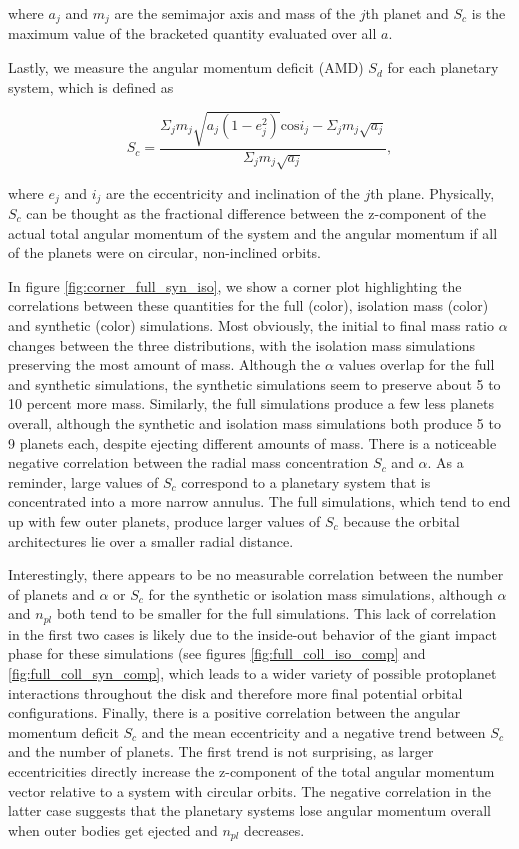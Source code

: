 \noindent where $a_{j}$ and $m_{j}$ are the semimajor axis and mass of the $j$th planet and $S_{c}$ is the maximum value of the bracketed quantity evaluated over all $a$.

Lastly, we measure the angular momentum deficit (AMD) $S_{d}$ for each planetary system, which is defined as

\begin{equation}\label{eq:amd}
	S_{c} = \frac{\Sigma_{j} m_{j} \sqrt{a_{j} \left( 1 - e_{j}^2 \right)} \mathrm{cos} i_{j} - \Sigma_{j} m_{j} \sqrt{a_{j}}}{\Sigma_{j} m_{j} \sqrt{a_{j}}},
\end{equation}

\noindent \cite{laskar97, chambers01} where $e_{j}$ and $i_{j}$ are the eccentricity and inclination of the $j$th plane. Physically, $S_{c}$ can be thought as the fractional difference between the z-component of the actual total angular momentum of the system and the angular momentum if all of the planets were on circular, non-inclined orbits.

In figure \ref{fig:corner_full_syn_iso}, we show a corner plot highlighting the correlations between these quantities for the full (color), isolation mass (color) and synthetic (color) simulations. Most obviously, the initial to final mass ratio $\alpha$ changes between the three distributions, with the isolation mass simulations preserving the most amount of mass. Although the $\alpha$ values overlap for the full and synthetic simulations, the synthetic simulations seem to preserve about 5 to 10 percent more mass. Similarly, the full simulations produce a few less planets overall, although the synthetic and isolation mass simulations both produce 5 to 9 planets each, despite ejecting different amounts of mass. There is a noticeable negative correlation between the radial mass concentration $S_{c}$ and $\alpha$. As a reminder, large values of $S_{c}$ correspond to a planetary system that is concentrated into a more narrow annulus. The full simulations, which tend to end up with few outer planets, produce larger values of $S_{c}$ because the orbital architectures lie over a smaller radial distance.

Interestingly, there appears to be no measurable correlation between the number of planets and $\alpha$ or $S_{c}$ for the synthetic or isolation mass simulations, although $\alpha$ and $n_{pl}$ both tend to be smaller for the full simulations. This lack of correlation in the first two cases is likely due to the inside-out behavior of the giant impact phase for these simulations (see figures \ref{fig:full_coll_iso_comp} and \ref{fig:full_coll_syn_comp}, which leads to a wider variety of possible protoplanet interactions throughout the disk and therefore more final potential orbital configurations. Finally, there is a positive correlation between the angular momentum deficit $S_{c}$ and the mean eccentricity and a negative trend between $S_{c}$ and the number of planets. The first trend is not surprising, as larger eccentricities directly increase the z-component of the total angular momentum vector relative to a system with circular orbits. The negative correlation in the latter case suggests that the planetary systems lose angular momentum overall when outer bodies get ejected and $n_{pl}$ decreases.

